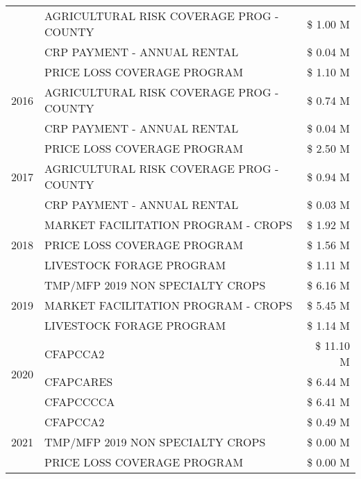 \begin{tabular}{llr}
 & AGRICULTURAL RISK COVERAGE PROG - COUNTY & \$ 1.00 M \\
 & CRP PAYMENT - ANNUAL RENTAL & \$ 0.04 M \\
\cline{1-3}
\multirow[t]{3}{*}{2016} & PRICE LOSS COVERAGE PROGRAM & \$ 1.10 M \\
 & AGRICULTURAL RISK COVERAGE PROG - COUNTY & \$ 0.74 M \\
 & CRP PAYMENT - ANNUAL RENTAL & \$ 0.04 M \\
\cline{1-3}
\multirow[t]{3}{*}{2017} & PRICE LOSS COVERAGE PROGRAM & \$ 2.50 M \\
 & AGRICULTURAL RISK COVERAGE PROG - COUNTY & \$ 0.94 M \\
 & CRP PAYMENT - ANNUAL RENTAL & \$ 0.03 M \\
\cline{1-3}
\multirow[t]{3}{*}{2018} & MARKET FACILITATION PROGRAM - CROPS & \$ 1.92 M \\
 & PRICE LOSS COVERAGE PROGRAM & \$ 1.56 M \\
 & LIVESTOCK FORAGE PROGRAM & \$ 1.11 M \\
\cline{1-3}
\multirow[t]{3}{*}{2019} & TMP/MFP 2019 NON SPECIALTY CROPS & \$ 6.16 M \\
 & MARKET FACILITATION PROGRAM - CROPS & \$ 5.45 M \\
 & LIVESTOCK FORAGE PROGRAM & \$ 1.14 M \\
\cline{1-3}
\multirow[t]{3}{*}{2020} & CFAPCCA2 & \$ 11.10 M \\
 & CFAPCARES & \$ 6.44 M \\
 & CFAPCCCCA & \$ 6.41 M \\
\cline{1-3}
\multirow[t]{3}{*}{2021} & CFAPCCA2 & \$ 0.49 M \\
 & TMP/MFP 2019 NON SPECIALTY CROPS & \$ 0.00 M \\
 & PRICE LOSS COVERAGE PROGRAM & \$ 0.00 M \\
\cline{1-3}
\bottomrule
\end{tabular}
